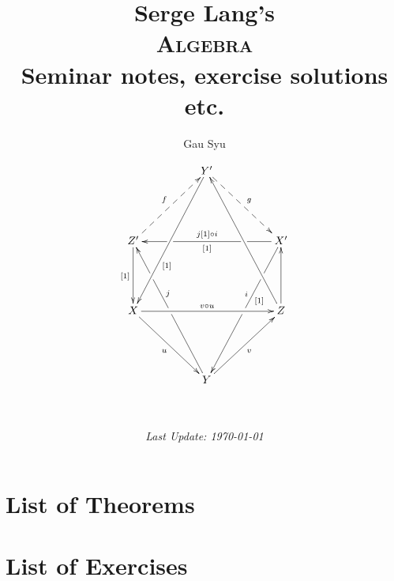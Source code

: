 %
%
%
%

%
%
%
%
\title{{\normalsize Serge Lang's}\\ \Huge\textsc{Algebra}\\ {\large Seminar notes, exercise solutions etc.}}
\author{Gau Syu}
\date{
\begin{gather*}
\xymatrix@=5em{
& Y' \ar@{-->}[dr]^g \ar[ddl]^(0.65){[1]} & \\
Z' \ar@{-->}[ur]^f \ar[d]_{[1]} & &
    X' \ar[ll]_{j[1] \circ i}^{[1]}|(0.25)\hole|(0.75)\hole
       \ar[ddl]_(0.4)i^(0.4){[1]}|(0.25)\hole|(0.5)\hole \\
X \ar[rr]^{v \circ u} \ar[dr]_u & &
    Z \ar[u] \ar[uul]\\
& Y \ar[ur]_v \ar[uul]_(0.6)j|(0.5)\hole|(0.75)\hole &
}\\
\\
\\
\end{gather*}
\emph{\small Last Update: \today}}


\frontmatter
\maketitle


\tableofcontents
\section*{List of Theorems}
\section*{List of Exercises}
\mainmatter
\pagestyle{plain}
